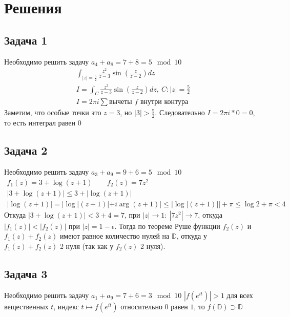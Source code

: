 
\newpage
\section*{Решения}
\subsection*{Задача 1}
	Необходимо решить задачу $a_4 + a_8 = 7 + 8 = 5 \mod 10$
	\begin{gather*}
		\int_{|z| = \frac{5}{2}} \frac{z^2}{z-3} \sin\left(\frac{z}{z-2}\right) dz\\
		I = \int_{C} \frac{z^2}{z-3} \sin\left(\frac{z}{z-2}\right) dz,\ C: |z| = \frac{5}{2}\\
		I = 2 \pi i \sum \text{вычеты $f$ внутри контура}
	\end{gather*}
	Заметим, что особые точки это $z = 3$, но $|3| > \frac{5}{2}$. Следовательно $I = 2 \pi i * 0 = 0$, то есть интеграл равен $0$
\vskip 0.4in

\subsection*{Задача 2}
	Необходимо решить задачу $a_3 + a_9 = 9 + 6 = 5 \mod 10$
	\begin{gather*}
		f_1(z) = 3 +\log(z+1)\qquad f_2(z) = 7z^2\\
		|3+\log(z+1)|\leqslant 3 + |\log(z+1)|\\
		|\log(z+1)| = |\log|(z+1)| + i \arg(z+1)| \leqslant |\log|(z+1)||+ \pi \leqslant \log 2 + \pi < 4
	\end{gather*}
	Откуда $|3 + \log(z+1)| < 3 + 4 = 7$, при $|z| \to 1:\ |7z^2| \to 7$, откуда $|f_1(z)| < |f_2(z)|$ при $|z| = 1 - \epsilon$. Тогда по теореме Руше функции $f_2(z)$ и $f_1(z) + f_2(z)$ имеют равное количество нулей на $\mathbb{D}$, откуда у $f_1(z) + f_2(z)$ 2 нуля (так как у $f_2(z)$ 2 нуля).
\vskip 0.4in

\subsection*{Задача 3}
	Необходимо решить задачу $a_1 + a_9 = 7 + 6 = 3 \mod 10$
	$|f(e^{it})|>1$ для всех вещественных $t$, индекс $t \mapsto f(e^{it})$ относительно $0$ равен $1$, то $f(\mathbb{D}) \supset \mathbb{D}$
\vskip 0.4in

